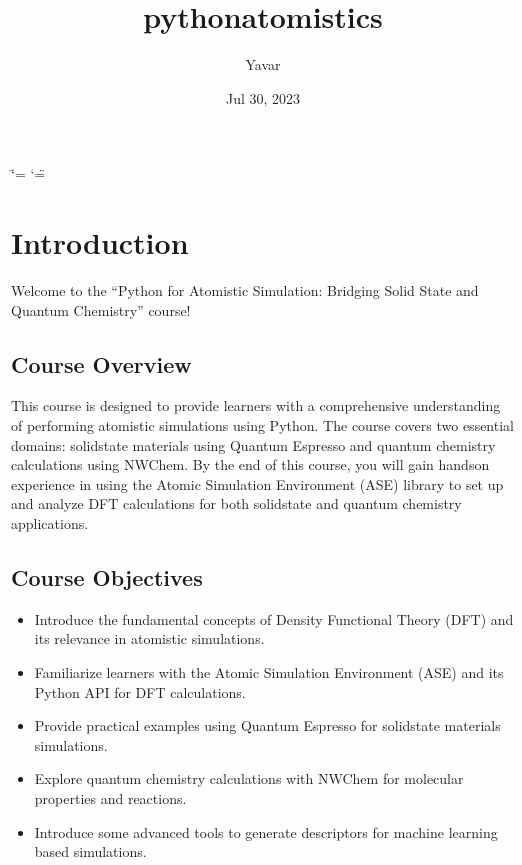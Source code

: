 \documentclass[letterpaper,10pt,english]{sphinxmanual}
\title{pythonatomistics}
\date{Jul 30, 2023}
\author{Yavar}
\begin{document}
\ifdefined\shorthandoff
  \ifnum\catcode`\=\string=\active\shorthandoff{=}\fi
  \ifnum\catcode`\"=\active{}\fi
\fi

\pagestyle{empty}
\sphinxmaketitle
\pagestyle{plain}
\sphinxtableofcontents
\pagestyle{normal}
\label{\detokenize{index::doc}}


\sphinxstepscope


\chapter{Introduction}
\label{\detokenize{introduction:introduction}}\label{\detokenize{introduction::doc}}
\sphinxAtStartPar
Welcome to the “Python for Atomistic Simulation: Bridging Solid State and Quantum Chemistry” course!


\section{Course Overview}
\label{\detokenize{introduction:course-overview}}
\sphinxAtStartPar
This course is designed to provide learners with a comprehensive understanding of performing atomistic simulations using Python. The course covers two essential domains: solid\sphinxhyphen{}state materials using Quantum Espresso and quantum chemistry calculations using NWChem. By the end of this course, you will gain hands\sphinxhyphen{}on experience in using the Atomic Simulation Environment (ASE) library to set up and analyze DFT calculations for both solid\sphinxhyphen{}state and quantum chemistry applications.


\section{Course Objectives}
\label{\detokenize{introduction:course-objectives}}\begin{itemize}
\item {} 
\sphinxAtStartPar
Introduce the fundamental concepts of Density Functional Theory (DFT) and its relevance in atomistic simulations.

\item {} 
\sphinxAtStartPar
Familiarize learners with the Atomic Simulation Environment (ASE) and its Python API for DFT calculations.

\item {} 
\sphinxAtStartPar
Provide practical examples using Quantum Espresso for solid\sphinxhyphen{}state materials simulations.

\item {} 
\sphinxAtStartPar
Explore quantum chemistry calculations with NWChem for molecular properties and reactions.

\item {} 
\sphinxAtStartPar
Introduce some advanced tools to generate descriptors for machine learning based simulations.

\end{itemize}
\end{document}
